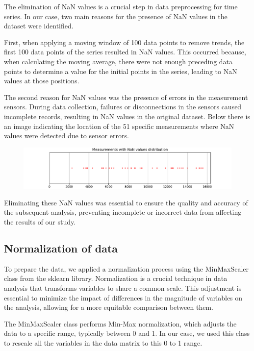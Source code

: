 The elimination of NaN values is a crucial step in data preprocessing for time series. In our case, two main reasons for the presence of NaN values in the dataset were identified.

First, when applying a moving window of 100 data points to remove trends, the first 100 data points of the series resulted in NaN values. This occurred because, when calculating the moving average, there were not enough preceding data points to determine a value for the initial points in the series, leading to NaN values at those positions.

The second reason for NaN values was the presence of errors in the measurement sensors. During data collection, failures or disconnections in the sensors caused incomplete records, resulting in NaN values in the original dataset. Below there is an image indicating the location of the 51 specific measurements where NaN values were detected due to sensor errors.

\begin{figure}[htbp]
    \centering
    \includegraphics[width=15 cm]{5_ChapterDesign/figuras/4_IndexNan/nan_index_distribution.pdf}
    \caption{}
\end{figure}


Eliminating these NaN values was essential to ensure the quality and accuracy of the subsequent analysis, preventing incomplete or incorrect data from affecting the results of our study.


\subsection{Normalization of data}

To prepare the data, we applied a normalization process using the MinMaxScaler class from the sklearn library. Normalization is a crucial technique in data analysis that transforms variables to share a common scale. This adjustment is essential to minimize the impact of differences in the magnitude of variables on the analysis, allowing for a more equitable comparison between them.

The MinMaxScaler class performs Min-Max normalization, which adjusts the data to a specific range, typically between 0 and 1. In our case, we used this class to rescale all the variables in the data matrix to this 0 to 1 range.

